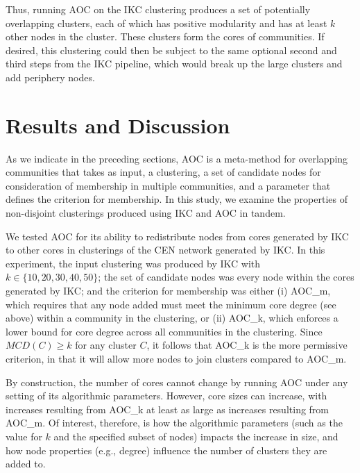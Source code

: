 \documentclass[11pt, oneside]{article}   	%
\begin{document}
Thus, running   AOC on the IKC clustering produces a set of potentially overlapping clusters, each of which has positive modularity and has at least $k$ other nodes in the cluster.
These clusters form the cores of communities.  If desired, this clustering could then be subject to the same optional second and third steps from the IKC pipeline, which would
break up the large clusters and add periphery nodes. 

\section{Results and Discussion}

As we indicate in the preceding sections, AOC is a meta-method for overlapping communities that takes as input, a clustering, a set of candidate nodes for consideration of membership in multiple communities, and a parameter that defines the criterion for membership. In this study, we examine the properties of non-disjoint clusterings produced using IKC and AOC in tandem. 

We tested AOC for its ability to redistribute nodes from cores generated by IKC to other cores in clusterings of the CEN network generated by IKC. In this experiment, the input clustering was produced by IKC with $k \in \{10, 20, 30, 40, 50\}$; the set of candidate nodes was every node within the cores generated by IKC; and the criterion for membership was either (i) AOC\_m, which requires that any node added must meet the minimum core degree  (see above) within a community in the clustering, or (ii) AOC\_k, which enforces a lower bound for core degree across all communities in the clustering. 
Since $MCD(C) \geq k$ for any cluster $C$, 
it follows that AOC\_k is the more permissive criterion, in that it will allow more nodes to join clusters compared to AOC\_m.

By construction, the number of cores cannot change by running AOC  under any setting of its algorithmic parameters.  
However, core sizes can increase, with increases resulting from AOC\_k at least as large as increases resulting from AOC\_m.
Of interest, therefore, is how the algorithmic parameters (such as the value for $k$ and the specified subset of nodes) impacts the increase in size, and how node properties (e.g., degree) influence the number of clusters they are added to.
\end{document}
